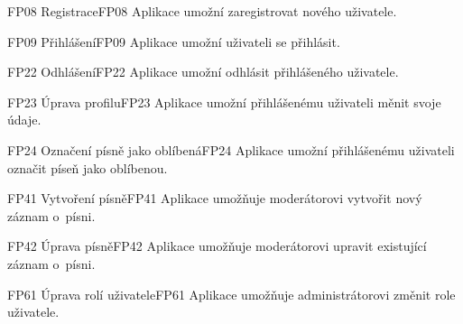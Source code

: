 \begin{requirment}{FP08 Registrace}{FP08}
    Aplikace umožní zaregistrovat nového uživatele.
\end{requirment}

\begin{requirment}{FP09 Přihlášení}{FP09}
    Aplikace umožní uživateli se přihlásit.
\end{requirment}

\begin{requirment}{FP22 Odhlášení}{FP22}
    Aplikace umožní odhlásit přihlášeného uživatele.
\end{requirment}

\begin{requirment}{FP23 Úprava profilu}{FP23}
    Aplikace umožní přihlášenému uživateli měnit svoje údaje.
\end{requirment}


\begin{requirment}{FP24 Označení písně jako oblíbená}{FP24}
    Aplikace umožní přihlášenému uživateli označit píseň jako oblíbenou.
\end{requirment}

\begin{requirment}{FP41 Vytvoření písně}{FP41}
    Aplikace umožňuje moderátorovi vytvořit nový záznam o~písni.
\end{requirment}

\begin{requirment}{FP42 Úprava písně}{FP42}
    Aplikace umožňuje moderátorovi upravit existující záznam o~písni.
\end{requirment}

\begin{requirment}{FP61 Úprava rolí uživatele}{FP61}
    Aplikace umožňuje administrátorovi změnit role uživatele.
\end{requirment}
